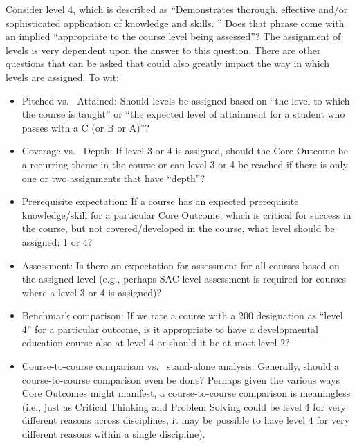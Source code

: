 Consider level 4, which is described as ``Demonstrates thorough, effective and/or sophisticated application of knowledge and skills.
''  Does that phrase come with an implied ``appropriate
to the course level being assessed''?
The assignment of levels is very dependent upon the answer to this question.
There are other questions that can be asked that could also greatly impact the way in which levels are assigned.
To wit:
\begin{itemize}
	\item Pitched vs.
	      \ Attained: Should levels be assigned based on ``the level to
	      which the course is taught'' or ``the expected level of attainment for a
	      student who passes with a C (or B or A)''?

	\item Coverage vs.
	      \ Depth: If level 3 or 4 is assigned, should the Core Outcome
	      be a recurring theme in the course or can level 3 or 4 be reached if there is
	      only one or two assignments that have ``depth''?

	\item Prerequisite expectation: If a course has an expected prerequisite knowledge/skill for a particular Core Outcome, which is critical for success in the course, but not covered/developed in the course, what level should be assigned: 1 or 4?

	\item Assessment: Is there an expectation for assessment for all courses based on the assigned level (e.g., perhaps SAC-level assessment is required for courses where a level 3 or 4 is assigned)?

	\item Benchmark comparison: If we rate a course with a 200 designation as ``level 4'' for a particular outcome, is it appropriate to have a developmental education course also at level 4 or should it be at most level 2?

	\item Course-to-course comparison vs.
	      \ stand-alone analysis: Generally, should
	      a course-to-course comparison even be done?
	      Perhaps given the various ways Core Outcomes might manifest, a course-to-course comparison is meaningless (i.e., just as Critical Thinking and Problem Solving could be level 4 for very different reasons across disciplines, it may be possible to have level 4 for very different reasons within a single discipline).
\end{itemize}


